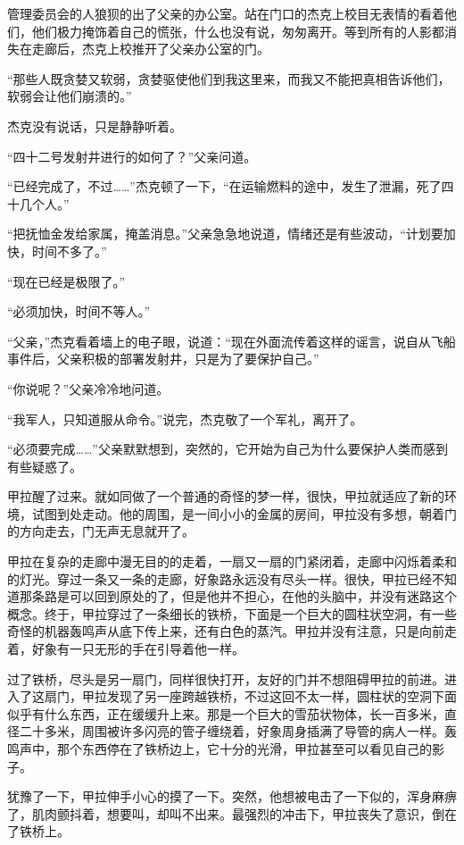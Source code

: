 管理委员会的人狼狈的出了父亲的办公室。站在门口的杰克上校目无表情的看着他们，他们极力掩饰着自己的慌张，什么也没有说，匆匆离开。等到所有的人影都消失在走廊后，杰克上校推开了父亲办公室的门。

“那些人既贪婪又软弱，贪婪驱使他们到我这里来，而我又不能把真相告诉他们，软弱会让他们崩溃的。”

杰克没有说话，只是静静听着。

“四十二号发射井进行的如何了？”父亲问道。

“已经完成了，不过……”杰克顿了一下，“在运输燃料的途中，发生了泄漏，死了四十几个人。”

“把抚恤金发给家属，掩盖消息。”父亲急急地说道，情绪还是有些波动，“计划要加快，时间不多了。”

“现在已经是极限了。”

“必须加快，时间不等人。”

“父亲，”杰克看着墙上的电子眼，说道：“现在外面流传着这样的谣言，说自从飞船事件后，父亲积极的部署发射井，只是为了要保护自己。”

“你说呢？”父亲冷冷地问道。

“我军人，只知道服从命令。”说完，杰克敬了一个军礼，离开了。

“必须要完成……”父亲默默想到，突然的，它开始为自己为什么要保护人类而感到有些疑惑了。

甲拉醒了过来。就如同做了一个普通的奇怪的梦一样，很快，甲拉就适应了新的环境，试图到处走动。他的周围，是一间小小的金属的房间，甲拉没有多想，朝着门的方向走去，门无声无息就开了。

甲拉在复杂的走廊中漫无目的的走着，一扇又一扇的门紧闭着，走廊中闪烁着柔和的灯光。穿过一条又一条的走廊，好象路永远没有尽头一样。很快，甲拉已经不知道那条路是可以回到原处的了，但是他并不担心，在他的头脑中，并没有迷路这个概念。终于，甲拉穿过了一条细长的铁桥，下面是一个巨大的圆柱状空洞，有一些奇怪的机器轰鸣声从底下传上来，还有白色的蒸汽。甲拉并没有注意，只是向前走着，好象有一只无形的手在引导着他一样。

过了铁桥，尽头是另一扇门，同样很快打开，友好的门并不想阻碍甲拉的前进。进入了这扇门，甲拉发现了另一座跨越铁桥，不过这回不太一样，圆柱状的空洞下面似乎有什么东西，正在缓缓升上来。那是一个巨大的雪茄状物体，长一百多米，直径二十多米，周围被许多闪亮的管子缠绕着，好象周身插满了导管的病人一样。轰鸣声中，那个东西停在了铁桥边上，它十分的光滑，甲拉甚至可以看见自己的影子。

犹豫了一下，甲拉伸手小心的摸了一下。突然，他想被电击了一下似的，浑身麻痹了，肌肉颤抖着，想要叫，却叫不出来。最强烈的冲击下，甲拉丧失了意识，倒在了铁桥上。

